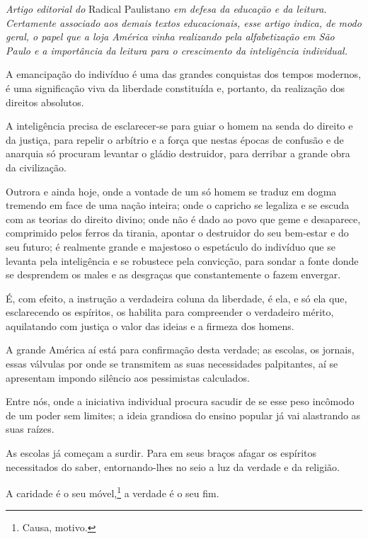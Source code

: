 \begin{didascalia}
\emph{Artigo editorial do} Radical Paulistano \emph{em defesa da educação e da
leitura. Certamente associado aos demais textos educacionais, esse
artigo indica, de modo geral, o papel que a loja América vinha
realizando pela alfabetização em São Paulo e a importância da leitura
para o crescimento da inteligência individual.}
\end{didascalia}

A emancipação do indivíduo é uma das grandes conquistas dos tempos
modernos, é uma significação viva da liberdade constituída e, portanto,
da realização dos direitos absolutos.

A inteligência precisa de esclarecer-se para guiar o homem na senda do
direito e da justiça, para repelir o arbítrio e a força que nestas
épocas de confusão e de anarquia só procuram levantar o gládio
destruidor, para derribar a grande obra da civilização.

Outrora e ainda hoje, onde a vontade de um só homem se traduz em dogma
tremendo em face de uma nação inteira; onde o capricho se legaliza e se
escuda com as teorias do direito divino; onde não é dado ao povo que
geme e desaparece, comprimido pelos ferros da tirania, apontar o
destruidor do seu bem-estar e do seu futuro; é realmente grande e
majestoso o espetáculo do indivíduo que se levanta pela inteligência e
se robustece pela convicção, para sondar a fonte donde se desprendem os
males e as desgraças que constantemente o fazem envergar.

É, com efeito, a instrução a verdadeira coluna da liberdade, é ela, e só
ela que, esclarecendo os espíritos, os habilita para compreender o
verdadeiro mérito, aquilatando com justiça o valor das ideias e a
firmeza dos homens.

A grande América aí está para confirmação desta verdade; as escolas, os
jornais, essas válvulas por onde se transmitem as suas necessidades
palpitantes, aí se apresentam impondo silêncio aos pessimistas
calculados.

Entre nós, onde a iniciativa individual procura sacudir de se esse peso %
incômodo de um poder sem limites; a ideia grandiosa do ensino popular já
vai alastrando as suas raízes.

As escolas já começam a surdir. Para em seus braços afagar os espíritos
necessitados do saber, entornando-lhes no seio a luz da verdade e da
religião.

A caridade é o seu móvel,\footnote{Causa, motivo.} a verdade é o seu
fim.

